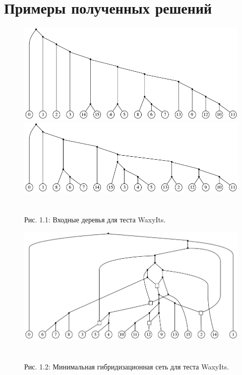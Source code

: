 
\FloatBarrier
\chapter{Примеры полученных решений} \label{AppendixA}

\begin{figure}[h!]
  \includegraphics[width=\linewidth]{img/Grass2WaxyIts_tree0}
  \includegraphics[width=\linewidth]{img/Grass2WaxyIts_tree1}
  \\\\\\
  \centering
  Рис. 1.1: Входные деревья для теста WaxyIts.
\end{figure}

\begin{figure}[h]
  \includegraphics[width=\linewidth]{img/Grass2WaxyIts}
  \\\\\\
  \centering
  Рис. 1.2: Минимальная гибридизационная сеть для теста WaxyIts.
\end{figure}

